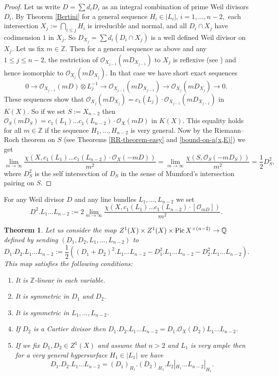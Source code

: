 \documentclass[twoside, 11pt]{article}
\theoremstyle{plain}
\newtheorem{Theorem}[Thm]{\sc Theorem}
\theoremstyle{definition}
\theoremstyle{remark}
\newcommand{\ZZ}{{\mathbb Z}}
\newcommand{\QQ}{{\mathbb Q}}
\newcommand{\cO}{{\mathcal O}}
\newcommand{\Pic}{{\mathop{\rm Pic \, }}}
\begin{document}
\begin{proof}
Let us write $D= \sum d_i D_i$ as an integral combination of prime Weil divisors $D_i$. By Theorem \ref{Bertini} for a general sequence $H_i\in  |L_i| $, $i=1,...,n-2,$  each intersection  $X_j:=\bigcap _{i\le j} H_i $ is irreducible and normal,  and all $D_i\cap X_j$ have codimension $1$ in $X_j$. So $D_{X_j}=\sum d_i (D_i\cap X_j)$ is a well defined Weil divisor on $X_j$. Let us fix $m\in \ZZ$. Then for a general sequence as above and any $1\le j\le n-2$,
the restriction of  $\cO_{X_{j-1}}(mD_{X_{j-1}})$ to $X_j$ is reflexive (see  \cite[Corollary 1.1.14]{HL}) and hence isomorphic to $\cO_{X_{j}}(mD_{X_{j}})$. 
In that case we have short exact sequences
$$0\to  \cO_{X_{j-1}}(mD) \otimes L_{j}^{-1}\to \cO_{X_{j-1}}(mD_{X_{j-1}}) \to \cO_{X_{j}}(mD_{X_{j}})\to 0.$$ 
These sequences show that $\cO_{X_{j}}(mD_{X_{j}}) =c_1(L_j)\cdot \cO_{X_{j-1}}(mD_{X_{j-1}})$
in $K(X)$. So if we set $S:=X_{n-2}$  then  $\cO_{S}(mD_{S}) =c_1(L_1)...c_1(L_{n-2}) \cdot \cO_X({mD}) $ in $K(X)$.
This equality holds for all $m\in \ZZ$ if the sequence $H_1,...,H_{n-2}$ is very general. 
Now by the Riemann--Roch theorem  on $S$ (see Theorems \ref{RR-theorem-easy} and \ref{bound-on-a(x,E)}) we get
$$
\lim _{m\to \infty }\frac {  \chi (X, c_1(L_1)...c_1(L_{n-2}) \cdot \cO_X (-mD)) }{m^2}
=\lim _{m\to \infty}\frac{\chi ({S},  \cO _{S} (-mD_S))}{m^2}=  \frac{1}{2}D_{S}^2,
$$
where $D_{S}^2$ is the self intersection of $D_S$ in the sense of Mumford's intersection pairing on $S$.
\end{proof}

\medskip

For any Weil divisor $D$ and any line bundles $L_1,...,L_{n-2}$ we set
$$D^2.L_1...L_{n-2}:= 2 \lim _{m\to \infty} \frac{  \chi (X, c_1(L_1)...c_1(L_{n-2}) \cdot [\cO_{mD}]) }{m^2}. $$



\begin{Theorem}\label{properties-of-intersection-product}
Let us consider the map $Z^1(X)\times Z^1(X)\times \Pic X^{\times (n-2)}\to \QQ$ defined by sending
$(D_1,D_2,L_1,... ,L_{n-2})$ to
$$ D_1.D_2.L_1...L_{n-2}:= \frac{1}{2}\left((D_1+D_2)^2.L_1...L_{n-2}   -D_1^2.L_1...L_{n-2}-D_2^2.L_1...L_{n-2}\right).$$
This map satisfies the following conditions:
\begin{enumerate}
\item It is $\ZZ$-linear in each variable. 
\item It is symmetric in $D_1$ and $D_2$.
\item It is symmetric in $L_1, ... ,L_{n-2}$.
\item If $D_2$ is a Cartier divisor then  $ D_1.D_2.L_1...L_{n-2}= D_1.\cO_X(D_2) L_1...L_{n-2}$.
\item If we fix $D_1, D_2\in  Z^1 (X)$ and assume that  $n>2$ and $L_1$ is very ample
then  for a very general hypersurface  $H_1\in |L_1|$ we have 
$$D_1.D_2.L_1...L_{n-2} =(D_1)_{H_1}.(D_2)_{H_1}.L_2|_{H_1}...L_{n-2}|_{H_1}.$$
\end{enumerate}
\end{Theorem}
\end{document}

